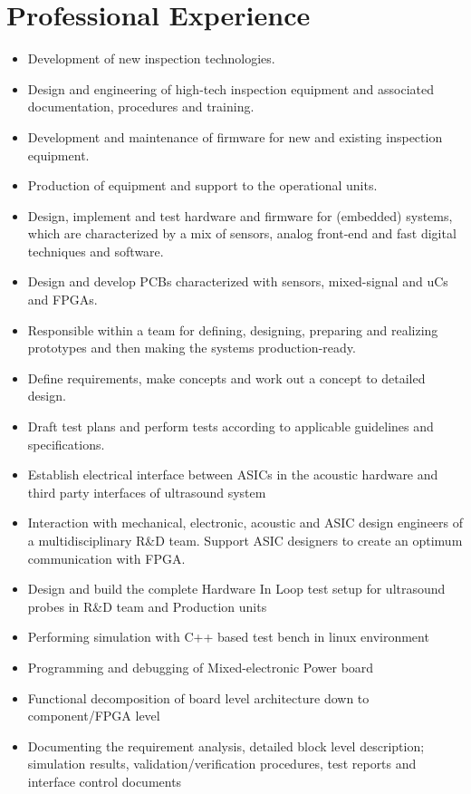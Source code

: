 \documentclass[10pt,a4paper,sans]{moderncv} %
\begin{document}
\section{Professional Experience}


{\begin{itemize}
\item Development of new inspection technologies.
\item Design and engineering of high-tech inspection equipment and associated documentation, procedures and training.
\item Development and maintenance of firmware for new and existing inspection equipment.
\item Production of equipment and support to the operational units.
\item Design, implement and test hardware and firmware for (embedded) systems, which are characterized by a mix of sensors, analog front-end and fast digital
techniques and software.
\item Design and develop PCBs characterized with sensors, mixed-signal and uCs and FPGAs.
\item Responsible within a team for defining, designing, preparing and realizing prototypes and then making the systems production-ready.
\item Define requirements, make concepts and work out a concept to detailed design.
\item Draft test plans and perform tests according to applicable guidelines and specifications.
\end{itemize}}

{\begin{itemize}
\item Establish electrical interface between ASICs in the acoustic hardware and third party interfaces of ultrasound system
\item Interaction with mechanical, electronic, acoustic and ASIC design engineers of a multidisciplinary R\&D team. Support ASIC designers to create an optimum communication with FPGA.
\item Design and build the complete Hardware In Loop test setup for ultrasound probes in R\&D team and Production units
\item Performing simulation with C++ based test bench in linux environment
\item Programming and debugging of Mixed-electronic Power board
\item Functional decomposition of board level architecture down to component/FPGA level
\item Documenting the requirement analysis, detailed block level description; simulation results, validation/verification procedures, test reports and interface control documents
\end{itemize}}
\end{document}
